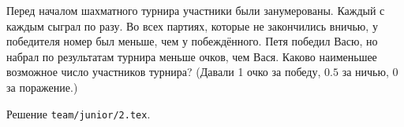 \problem{}
Перед началом шахматного турнира участники были занумерованы.
Каждый с каждым сыграл по разу.
Во всех партиях, которые не закончились вничью, у победителя номер был меньше,
чем у побеждённого.
Петя победил Васю, но набрал по результатам турнира меньше очков, чем Вася.
Каково наименьшее возможное число участников турнира?
(Давали 1 очко за победу, $0.5$ за ничью, 0 за поражение.)

\solution Решение \texttt{team/junior/2.tex}.
\endproblem
